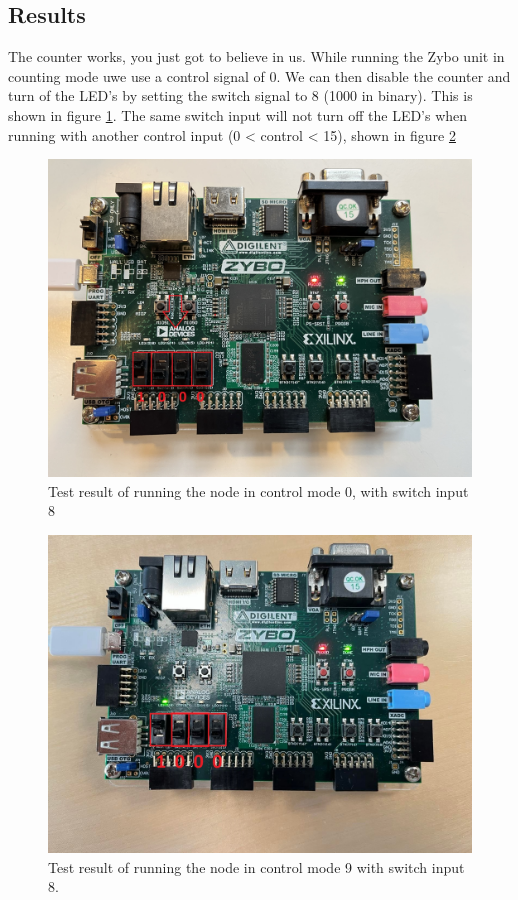 \documentclass[a4paper,12pt]{report}    %
\begin{document}
\subsection{Results}

The counter works, you just got to believe in us. While running the Zybo unit in counting mode uwe use a control signal of 0. We can then disable the counter and turn of the LED's by setting the switch signal to 8 (1000 in binary). This is shown in figure \ref{FIG::27::MODE0}. The same switch input will not turn off the LED's when running with another control input (0 < control < 15), shown in figure \ref{FIG::27::MODE1}

\begin{figure}[H]
  \centering
  \includegraphics[width=\linewidth]{latex/figures/ass2_27_result_0x8.jpeg}
  \caption{Test result of running the node in control mode 0, with switch input 8}
  \label{FIG::27::MODE0}
\end{figure}

\begin{figure}[H]
  \centering
  \includegraphics[width=\linewidth]{latex/figures/ass2_27_crl15_result.jpg}
  \caption{Test result of running the node in control mode 9 with switch input 8.}
  \label{FIG::27::MODE1}
\end{figure}
\end{document}
